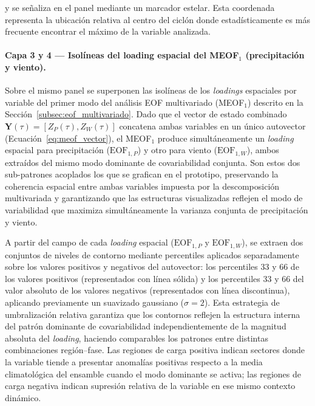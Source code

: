 y se señaliza en el panel mediante un marcador estelar. 
Esta coordenada representa la ubicación relativa al centro del ciclón donde estadísticamente es más frecuente encontrar el máximo de la variable analizada.

\paragraph{Capa 3 y 4 — Isolíneas del loading espacial del MEOF$_1$ (precipitación y viento).}

Sobre el mismo panel se superponen las isolíneas de los \textit{loadings} espaciales por variable del primer modo del análisis EOF multivariado (MEOF$_1$) descrito en la Sección~\ref{subsec:eof_multivariado}. 
Dado que el vector de estado combinado $\mathbf{Y}(\tau) = [Z_P(\tau), Z_W(\tau)]$ concatena ambas variables en un único autovector (Ecuación~\ref{eq:meof_vector}), el MEOF$_1$ produce simultáneamente un 
\textit{loading} espacial para precipitación ($\text{EOF}_{1,P}$) y otro para viento ($\text{EOF}_{1,W}$), ambos extraídos del mismo modo dominante de covariabilidad conjunta. 
Son estos dos sub-patrones acoplados los que se grafican en el prototipo, preservando la coherencia espacial entre ambas variables impuesta por la descomposición multivariada y garantizando que las estructuras visualizadas reflejen el modo de variabilidad que maximiza simultáneamente la varianza conjunta de precipitación y viento.

A partir del campo de cada \textit{loading} espacial ($\text{EOF}_{1,P}$ y $\text{EOF}_{1,W}$), se extraen dos conjuntos de niveles de contorno mediante percentiles aplicados separadamente sobre los valores positivos y negativos del autovector: los percentiles 33 y 66 de los valores positivos (representados con línea sólida) y los percentiles 33 y 66 del valor absoluto de los valores negativos (representados con línea discontinua), aplicando previamente un suavizado gaussiano ($\sigma = 2$). Esta estrategia 
de umbralización relativa garantiza que los contornos reflejen la estructura interna del patrón dominante de covariabilidad independientemente de la magnitud absoluta del \textit{loading}, haciendo comparables los patrones entre distintas combinaciones región--fase. Las regiones de carga positiva indican sectores donde la variable tiende a presentar anomalías positivas respecto a la media climatológica del ensamble cuando el 
modo dominante se activa; las regiones de carga negativa indican supresión relativa de la variable en ese mismo contexto dinámico.

